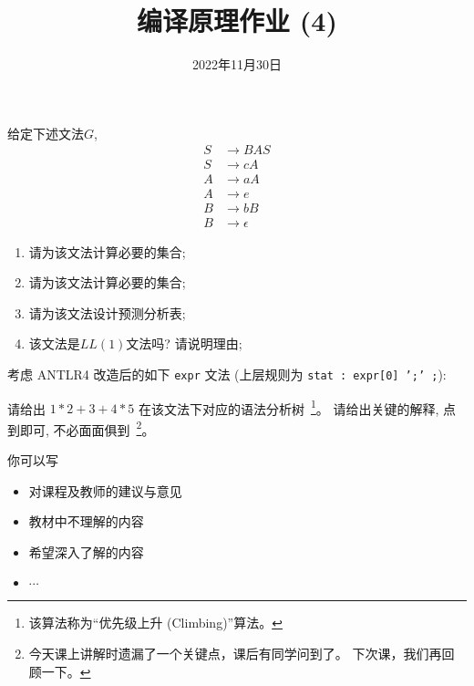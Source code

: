 \documentclass[a4paper, justified]{tufte-handout}
\title{编译原理作业 (4)}
\date{2022年11月30日}
\begin{document}
\maketitle
\noplagiarism %
\begin{abstract}
\end{abstract}
\beginrequired

\begin{problem}
  给定下述文法$G$,
  \begin{align}
    S &\to BAS \\[8pt]
    S &\to cA \\[8pt]
    A &\to aA \\[8pt]
    A &\to e \\[8pt]
    B &\to bB \\[8pt]
    B &\to \epsilon
  \end{align}

  \begin{enumerate}[(1)]
    \item 请为该文法计算必要的\first{}集合;
    \item 请为该文法计算必要的\follow{}集合;
    \item 请为该文法设计预测分析表;
    \item 该文法是$LL(1)$文法吗? 请说明理由;
  \end{enumerate}
\end{problem}

\begin{solution}
\end{solution}

\pagebreak
\begin{problem}
  考虑 ANTLR4 改造后的如下 \texttt{expr} 文法
  (上层规则为 \texttt{stat : expr[0] ';' ;}):


  \noindent 请给出 $1 \ast 2 + 3 + 4 \ast 5$
  在该文法下对应的语法分析树~\footnote{该算法称为``优先级上升 (Climbing)''算法。}。
  请给出关键的解释, 点到即可, 不必面面俱到~\footnote{
    今天课上讲解时遗漏了一个关键点，课后有同学问到了。
    下次课，我们再回顾一下。
  }。
\end{problem}

\begin{solution}
\end{solution}



\beginfb

你可以写
\begin{itemize}
  \item 对课程及教师的建议与意见
  \item 教材中不理解的内容
  \item 希望深入了解的内容
  \item $\cdots$
\end{itemize}
\end{document}
